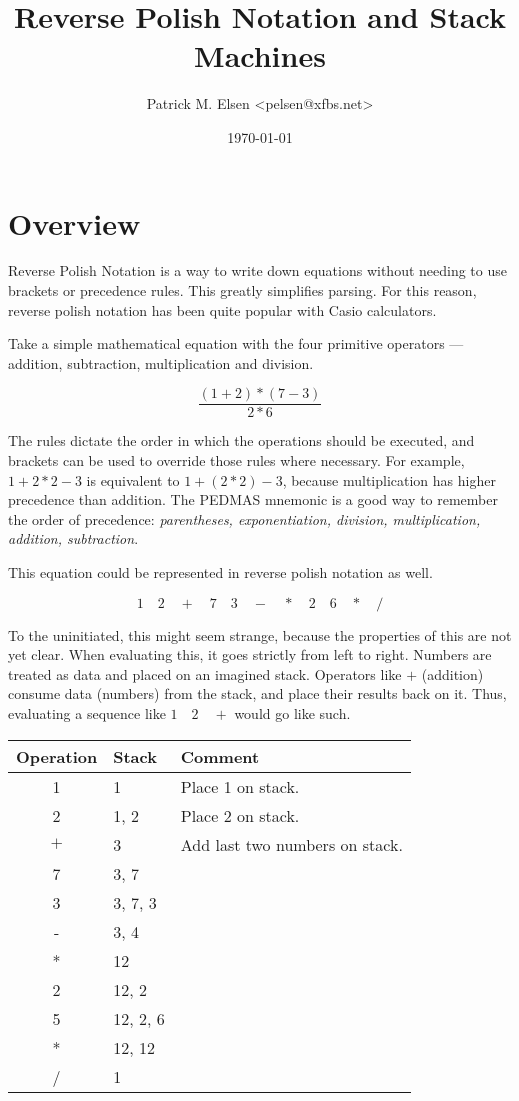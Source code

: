 \documentclass[a4paper,twocolumn]{article}
\title{Reverse Polish Notation and Stack Machines}
\author{Patrick M. Elsen <pelsen@xfbs.net>}
\date{\today}
\begin{document}
\maketitle
\tableofcontents

\section{Overview}

Reverse Polish Notation is a way to write down equations without needing to use brackets or precedence rules. This greatly simplifies parsing. For this reason, reverse polish notation has been quite popular with Casio calculators.

Take a simple mathematical equation with the four primitive operators — addition, subtraction, multiplication and division.

\begin{equation}
  \frac{(1 + 2) * (7 - 3)}{2 * 6}
\end{equation}

The rules dictate the order in which the operations should be executed, and brackets can be used to override those rules where necessary. For example, $1 + 2 * 2 - 3$ is equivalent to $1 + (2 * 2) - 3$, because multiplication has higher precedence than addition. The PEDMAS mnemonic is a good way to remember the order of precedence: \emph{parentheses, exponentiation, division, multiplication, addition, subtraction}. 

This equation could be represented in reverse polish notation as well.

\begin{equation}
1\quad2\quad+\quad7\quad3\quad-\quad*\quad2\quad6\quad*\quad/  
\end{equation}

To the uninitiated, this might seem strange, because the properties of this are not yet clear. When evaluating this, it goes strictly from left to right. Numbers are treated as data and placed on an imagined stack. Operators like $+$ (addition) consume data (numbers) from the stack, and place their results back on it. Thus, evaluating a sequence like $1\quad2\quad+$ would go like such.

\begin{table}[h!]
\begin{tabular}{@{}clp{4cm}@{}}
\toprule
Operation & Stack & Comment\\
\midrule
1 & 1 & Place 1 on stack.\\
2 & 1, 2 & Place 2 on stack.\\
$+$ & 3 & Add last two numbers on stack.\\
7 & 3, 7\\
3 & 3, 7, 3\\
- & 3, 4\\
* & 12\\
2 & 12, 2\\
5 & 12, 2, 6\\
* & 12, 12\\
/ & 1\\
\bottomrule  
\end{tabular}
\end{table}
\end{document}
